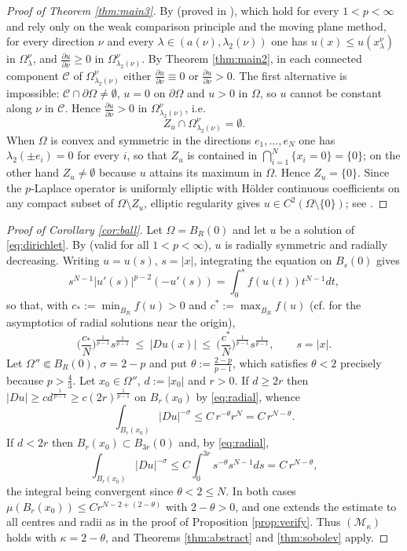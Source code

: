 \documentclass[reqno]{amsart}
\theoremstyle{plain}
\theoremstyle{definition}
\theoremstyle{remark}
\begin{document}
\begin{proof}[Proof of Theorem \ref{thm:main3}]
By \cite[Theorem 2.3 and Corollary 2.1]{DS2} (proved in \cite{DS1}), which hold for every
$1<p<\infty$ and rely only on the
weak comparison principle and the moving plane method, for every direction $\nu$ and every
$\lambda\in(a(\nu),\lambda_2(\nu))$ one has $u(x)\le u(x_\lambda^\nu)$ in $\Omega^\nu_\lambda$, and
$\frac{\partial u}{\partial\nu}\ge0$ in $\Omega^{\nu}_{\lambda_2(\nu)}$. By Theorem \ref{thm:main2}, in each connected component $\mathcal C$ of $\Omega^{\nu}_{\lambda_2(\nu)}$ either
$\frac{\partial u}{\partial\nu}\equiv0$ or $\frac{\partial u}{\partial\nu}>0$. The first alternative
is impossible: $\mathcal C\cap\partial\Omega\ne\emptyset$, $u=0$ on $\partial\Omega$ and $u>0$ in
$\Omega$, so $u$ cannot be constant along $\nu$ in $\mathcal C$. Hence
$\frac{\partial u}{\partial\nu}>0$ in $\Omega^{\nu}_{\lambda_2(\nu)}$, i.e.
\[
Z_u\cap\Omega^{\nu}_{\lambda_2(\nu)}=\emptyset .
\]
When $\Omega$ is convex and symmetric in the directions $e_1,\dots,e_N$ one has
$\lambda_2(\pm e_i)=0$ for every $i$, so that $Z_u$ is contained in
$\bigcap_{i=1}^N\{x_i=0\}=\{0\}$; on the other hand $Z_u\ne\emptyset$ because $u$ attains its
maximum in $\Omega$. Hence $Z_u=\{0\}$. Since the $p$-Laplace operator is uniformly elliptic with
H\"older continuous coefficients on any compact subset of $\Omega\setminus Z_u$, elliptic
regularity gives $u\in C^2(\Omega\setminus\{0\})$; see \cite[Theorem 1.3]{DS2}.
\end{proof}

\begin{proof}[Proof of Corollary \ref{cor:ball}]
Let $\Omega=B_R(0)$ and let $u$ be a solution of
\eqref{eq:dirichlet}. By \cite[Corollary 2.1]{DS2} (valid for all $1<p<\infty$), $u$ is radially
symmetric and radially decreasing. Writing $u=u(s)$, $s=|x|$, integrating the equation on $B_s(0)$
gives
\[
s^{N-1}|u'(s)|^{p-2}(-u'(s))=\int_0^{s}f(u(t))t^{N-1}dt ,
\]
so that, with $c_*:=\min_{\overline{B_R}}f(u)>0$ and $c^*:=\max_{\overline{B_R}}f(u)$ (cf.
\cite{SerrinTang} for the asymptotics of radial solutions near the origin),
\begin{equation}\label{eq:radial}
\Big(\frac{c_*}{N}\Big)^{\frac1{p-1}}s^{\frac1{p-1}}\ \le\ |Du(x)|\ \le\
\Big(\frac{c^*}{N}\Big)^{\frac1{p-1}}s^{\frac1{p-1}},\qquad s=|x| .
\end{equation}
Let $\Omega''\Subset B_R(0)$, $\sigma=2-p$ and put $\theta:=\frac{2-p}{p-1}$, which satisfies
$\theta<2$ precisely because $p>\frac43$. Let $x_0\in\Omega''$, $d:=|x_0|$ and $r>0$. If
$d\ge2r$ then $|Du|\ge cd^{\frac1{p-1}}\ge c(2r)^{\frac{1}{p-1}}$ on $B_r(x_0)$ by \eqref{eq:radial},
whence
\[
\int_{B_r(x_0)}|Du|^{-\sigma}\le C\,r^{-\theta}r^{N}=C\,r^{N-\theta} .
\]
If $d<2r$ then $B_r(x_0)\subset B_{3r}(0)$ and, by \eqref{eq:radial},
\[
\int_{B_r(x_0)}|Du|^{-\sigma}\le C\int_0^{3r}s^{-\theta}s^{N-1}ds=C\,r^{N-\theta},
\]
the integral being convergent since $\theta<2\le N$. In both cases
$\mu(B_r(x_0))\le Cr^{N-2+(2-\theta)}$ with $2-\theta>0$, and one extends the estimate to all
centres and radii as in the proof of Proposition \ref{prop:verify}. Thus $(\mathcal M_\kappa)$ holds
with $\kappa=2-\theta$, and Theorems \ref{thm:abstract} and \ref{thm:sobolev} apply.
\end{proof}
\end{document}

